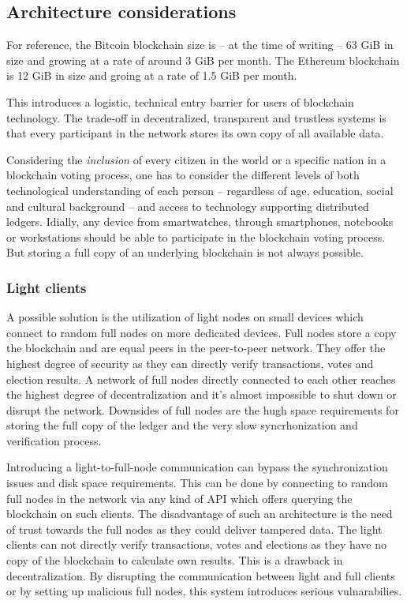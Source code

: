 \documentclass[9pt,oneside]{amsart}
\begin{document}
\begin{multicols}{2}
\subsection{Architecture considerations}
For reference, the Bitcoin blockchain size is -- at the time of writing -- 63 GiB in size and growing at a rate of around 3 GiB per month. The Ethereum blockchain is 12 GiB in size and groing at a rate of 1.5 GiB per month.\par
This introduces a logistic, technical entry barrier for users of blockchain technology. The trade-off in decentralized, transparent and trustless systems is that every participant in the network stores its own copy of all available data.\par
Considering the \textit{inclusion} of every citizen in the world or a specific nation in a blockchain voting process, one has to consider the different levels of both technological understanding of each person -- regardless of age, education, social and cultural background -- and access to technology supporting distributed ledgers. Idially, any device from smartwatches, through smartphones, notebooks or workstations should be able to participate in the blockchain voting process. But storing a full copy of an underlying blockchain is not always possible.
\subsubsection{Light clients} %
A possible solution is the utilization of light nodes on small devices which connect to random full nodes on more dedicated devices. Full nodes store a copy the blockchain and are equal peers in the peer-to-peer network. They offer the highest degree of security as they can directly verify transactions, votes and election results. A network of full nodes directly connected to each other reaches the highest degree of decentralization and it's almost impossible to shut down or disrupt the network. Downsides of full nodes are the hugh space requirements for storing the full copy of the ledger and the very slow syncrhonization and verification process.\par
Introducing a light-to-full-node communication can bypass the synchronization issues and disk space requirements. This can be done by connecting to random full nodes in the network via any kind of API which offers querying the blockchain on such clients. The disadvantage of such an architecture is the need of trust towards the full nodes as they could deliver tampered data. The light clients can not directly verify transactions, votes and elections as they have no copy of the blockchain to calculate own results. This is a drawback in decentralization. By disrupting the communication between light and full clients or by setting up malicious full nodes, this system introduces serious vulnarabilies.

\end{multicols}
\end{document}

